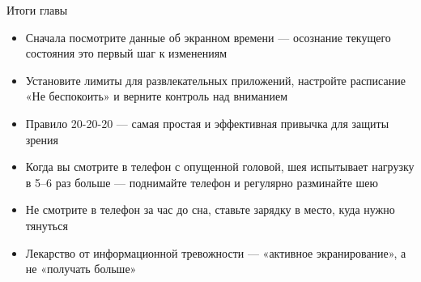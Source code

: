 \begin{tcbsummary}{Итоги главы}
\begin{itemize}
  \item Сначала посмотрите данные об экранном времени — осознание текущего состояния это первый шаг к изменениям
  \item Установите лимиты для развлекательных приложений, настройте расписание «Не беспокоить» и верните контроль над вниманием
  \item Правило 20-20-20 — самая простая и эффективная привычка для защиты зрения
  \item Когда вы смотрите в телефон с опущенной головой, шея испытывает нагрузку в 5–6 раз больше — поднимайте телефон и регулярно разминайте шею
  \item Не смотрите в телефон за час до сна, ставьте зарядку в место, куда нужно тянуться
  \item Лекарство от информационной тревожности — «активное экранирование», а не «получать больше»
\end{itemize}

\end{tcbsummary}

